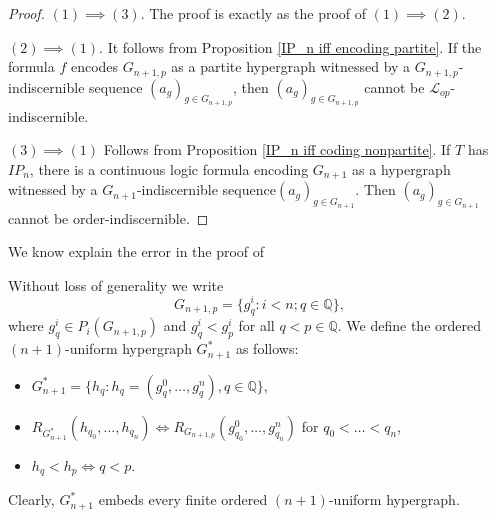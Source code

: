 \documentclass{amsart}
\newtheorem{external claim}[teor]{Claim}
\newcommand{\mL}{\mathcal{L}}
\begin{document}
\begin{proof}
            $(1)\implies(3)$. The proof is exactly as the proof of $(1)\implies (2)$.
            
            $(2)\implies(1)$. It follows from Proposition \ref{IP_n iff encoding partite}. If the formula $f$ encodes $G_{n+1,p}$ as a partite hypergraph witnessed by a $G_{n+1,p}$-indiscernible sequence $(a_g)_{g\in G_{n+1,p}}$, then $(a_g)_{g\in G_{n+1,p}}$ cannot be $\mL_{op}$-indiscernible.
            
            $(3)\implies(1)$ Follows from Proposition \ref{IP_n iff coding nonpartite}. If $T$ has $IP_n$, there is a continuous logic formula encoding $G_{n+1}$ as a hypergraph witnessed by a $G_{n+1}$-indiscernible sequence$ (a_g)_{g\in G_{n+1}}$. Then $(a_g)_{g\in G_{n+1}}$ cannot be order-indiscernible.
    \end{proof}

We know explain the error in the proof of \cite[Theorem 5.4 $(3)\implies (2)$]{Chernikov2014OnN}

Without loss of generality we write $$G_{n+1,p}=\{ g^i_q: i<n; q\in \mathbb{Q}\},$$ where $g^i_q \in P_i(G_{n+1,p})$ and $g^i_q<g^i_p$ for all $q<p\in \mathbb{Q}$. We define the ordered $(n+1)$-uniform hypergraph $G^*_{n+1}$ as follows:
\begin{itemize}
    \item $G^*_{n+1}=\{ h_q: h_q=(g^0_q,\dots, g^n_q), q\in \mathbb{Q} \}$,
    \item $ R_{G^*_{n+1}}( h_{q_0},\dots, h_{q_n} ) \iff R_{G_{n+1,p}}( g^0_{q_0},\dots, g^n_{q_n} ) $ for $q_0<\dots<q_n$,
    \item $h_q<h_p \iff q<p$.  
\end{itemize}
Clearly, $G^*_{n+1}$ embeds every finite ordered $(n+1)$-uniform hypergraph.
\end{document}
